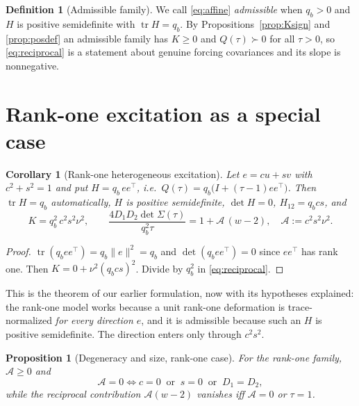 \documentclass[11pt]{article}
\theoremstyle{plain}
\newtheorem{proposition}[theorem]{Proposition}
\newtheorem{corollary}[theorem]{Corollary}
\theoremstyle{definition}
\newtheorem{definition}[theorem]{Definition}
\theoremstyle{remark}
\newcommand{\tr}{\operatorname{tr}}
\newcommand{\Sig}{\Sigma}
\newcommand{\Aco}{\mathcal{A}}
\newcommand{\T}{^{\!\top}}
\begin{document}
\begin{definition}[Admissible family]\label{def:admissible}
We call \eqref{eq:affine} \emph{admissible} when $q_b>0$ and $H$ is positive semidefinite with
$\tr H=q_b$. By Propositions~\ref{prop:Ksign} and \ref{prop:posdef} an admissible family has
$K\ge0$ and $Q(\tau)\succ0$ for all $\tau>0$, so \eqref{eq:reciprocal} is a statement about
genuine forcing covariances and its slope is nonnegative.
\end{definition}

\section{Rank-one excitation as a special case}\label{sec:rankone}

\begin{corollary}[Rank-one heterogeneous excitation]\label{cor:rankone}
Let $e=cu+sv$ with $c^2+s^2=1$ and put $H=q_b\,ee\T$, i.e.\
$Q(\tau)=q_b\bigl(I+(\tau-1)ee\T\bigr)$. Then $\tr H=q_b$ automatically, $H$ is positive
semidefinite, $\det H=0$, $H_{12}=q_bcs$, and
\begin{equation}
  K=q_b^2\,c^2s^2\nu^2,
  \qquad
  \frac{4D_1D_2\det\Sig(\tau)}{q_b^2\tau}=1+\Aco\,(w-2),
  \quad \Aco:=c^2s^2\nu^2. \label{eq:rankone}
\end{equation}
\end{corollary}

\begin{proof}
$\tr(q_bee\T)=q_b\|e\|^2=q_b$ and $\det(q_bee\T)=0$ since $ee\T$ has rank one. Then
$K=0+\nu^2(q_bcs)^2$. Divide by $q_b^2$ in \eqref{eq:reciprocal}.
\end{proof}

This is the theorem of our earlier formulation, now with its hypotheses explained: the rank-one
model works because a unit rank-one deformation is trace-normalized \emph{for every direction
$e$}, and it is admissible because such an $H$ is positive semidefinite. The direction enters
only through $c^2s^2$.

\begin{proposition}[Degeneracy and size, rank-one case]\label{prop:degenerate}
For the rank-one family, $\Aco\ge0$ and
\begin{equation}
  \Aco=0 \iff c=0\ \text{ or }\ s=0\ \text{ or }\ D_1=D_2, \label{eq:degen}
\end{equation}
while the reciprocal contribution $\Aco(w-2)$ vanishes iff $\Aco=0$ or $\tau=1$.
\end{proposition}
\end{document}
